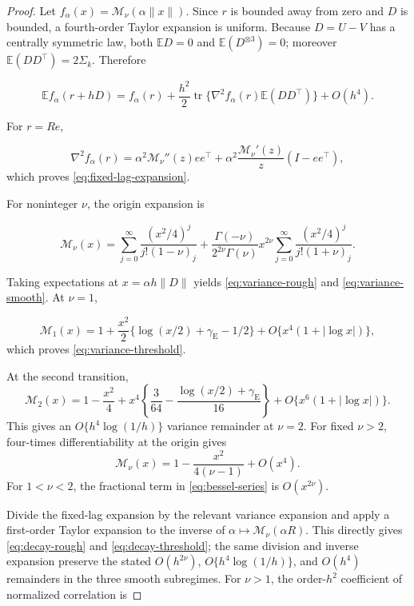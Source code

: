 \documentclass[11pt]{article}
\theoremstyle{remark}
\newcommand{\Matern}{\mathcal M}
\newcommand{\E}{\mathbb E}
\newcommand{\tr}{\operatorname{tr}}
\begin{document}
\begin{proof}

Let \(f_\alpha(x)=\Matern_\nu(\alpha\lVert x\rVert)\).  Since \(r\) is bounded
away from zero and \(D\) is bounded, a fourth-order Taylor expansion is uniform.
Because \(D=U-V\) has a centrally symmetric law, both
\(\E D=0\) and \(\E(D^{\otimes3})=0\); moreover
\(\E(DD^\top)=2\Sigma_k\).  Therefore

\begin{equation}
  \E f_\alpha(r+hD)
  =f_\alpha(r)
   +\frac{h^2}{2}\tr\{\nabla^2f_\alpha(r)\E(DD^\top)\}
   +O(h^4).
\end{equation}

For \(r=Re\),

\begin{equation}
  \nabla^2f_\alpha(r)
  =\alpha^2\Matern_\nu''(z)ee^\top
   +\alpha^2\frac{\Matern_\nu'(z)}{z}(I-ee^\top),
\end{equation}
which proves \eqref{eq:fixed-lag-expansion}.

For noninteger \(\nu\), the origin expansion is

\begin{equation}
  \Matern_\nu(x)
  =\sum_{j=0}^{\infty}
    \frac{(x^2/4)^j}{j!(1-\nu)_j}
   +\frac{\Gamma(-\nu)}{2^{2\nu}\Gamma(\nu)}x^{2\nu}
    \sum_{j=0}^{\infty}
    \frac{(x^2/4)^j}{j!(1+\nu)_j}.
  \label{eq:bessel-series}
\end{equation}

Taking expectations at \(x=\alpha h\lVert D\rVert\) yields
\eqref{eq:variance-rough} and \eqref{eq:variance-smooth}.  At \(\nu=1\),

\begin{equation}
  \Matern_1(x)
  =1+\frac{x^2}{2}
    \{\log(x/2)+\gamma_{\mathrm E}-1/2\}
   +O\{x^4(1+|\log x|)\},
\end{equation}
which proves \eqref{eq:variance-threshold}.

At the second transition,
\begin{equation}
  \Matern_2(x)
  =1-\frac{x^2}{4}
   +x^4\left\{\frac{3}{64}
   -\frac{\log(x/2)+\gamma_{\mathrm E}}{16}\right\}
   +O\{x^6(1+|\log x|)\}.
\end{equation}
This gives an \(O\{h^4\log(1/h)\}\) variance remainder at \(\nu=2\).
For fixed \(\nu>2\), four-times differentiability at the origin gives
\[
  \Matern_\nu(x)
  =1-\frac{x^2}{4(\nu-1)}+O(x^4).
\]
For \(1<\nu<2\), the fractional term in
\eqref{eq:bessel-series} is \(O(x^{2\nu})\).

Divide the fixed-lag expansion by the relevant variance expansion and apply a
first-order Taylor expansion to the inverse of
\(\alpha\mapsto\Matern_\nu(\alpha R)\).  This directly gives
\eqref{eq:decay-rough} and \eqref{eq:decay-threshold}; the same division and
inverse expansion preserve the stated \(O(h^{2\nu})\),
\(O\{h^4\log(1/h)\}\), and \(O(h^4)\) remainders in the three smooth
subregimes.  For \(\nu>1\), the
order-\(h^2\) coefficient of normalized correlation is


\end{proof}
\end{document}
